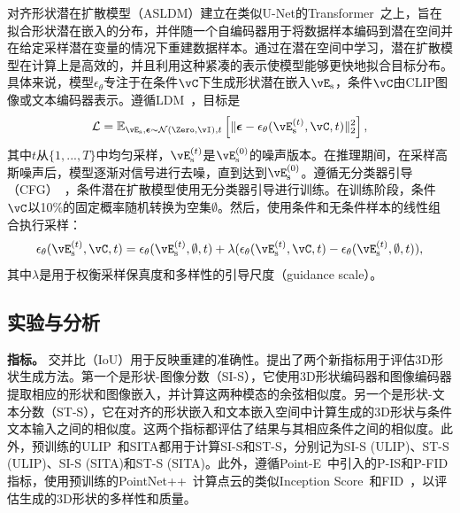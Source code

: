 \documentclass[../../book-main_zh.tex]{subfiles}
\begin{document}
对齐形状潜在扩散模型（ASLDM）建立在类似U-Net的Transformer~\cite{10203178}之上，旨在拟合形状潜在嵌入的分布，并伴随一个自编码器用于将数据样本编码到潜在空间并在给定采样潜在变量的情况下重建数据样本。通过在潜在空间中学习，潜在扩散模型在计算上是高效的，并且利用这种紧凑的表示使模型能够更快地拟合目标分布。具体来说，模型$\epsilon_{\theta}$专注于在条件$\vC$下生成形状潜在嵌入$\vE_{\mathrm{s}}$，条件$\vC$由CLIP图像或文本编码器表示。遵循LDM~\cite{rombach2022high}，目标是
\begin{equation}
\mathcal{L} = \mathbb{E}_{\vE_{\mathrm{s}}, \boldsymbol{\epsilon} \sim
\mathcal{N}(\Zero,\vI),t} \left[ \Vert \boldsymbol{\epsilon}
- \epsilon_\theta(\vE_{\mathrm{s}}^{(t)}, \vC, t) \Vert^2_2 \right],
\end{equation}
其中$t$从$\{1, ..., T\}$中均匀采样，$\vE_{\mathrm{s}}^{(t)}$是$\vE_{\mathrm{s}}^{(0)}$的噪声版本。在推理期间，在采样高斯噪声后，模型逐渐对信号进行去噪，直到达到$\vE_{\mathrm{s}}^{(0)}$。遵循无分类器引导（CFG）~\cite{ho2021classifierfree}，条件潜在扩散模型使用无分类器引导进行训练。在训练阶段，条件$\vC$以10\%的固定概率随机转换为空集$\emptyset$。然后，使用条件和无条件样本的线性组合执行采样：
\begin{equation}
\epsilon_\theta ( \vE_{\mathrm{s}}^{(t)}, \vC, t ) = \epsilon_\theta(
\vE_{\mathrm{s}}^{(t)}, \emptyset, t ) + \lambda
( \epsilon_\theta( \vE_{\mathrm{s}}^{(t)}, \vC, t ) -\epsilon_\theta(
\vE_{\mathrm{s}}^{(t)}, \emptyset, t ) ),
\label{eq:cfg-michelangelo}
\end{equation}
其中$\lambda$是用于权衡采样保真度和多样性的引导尺度（guidance scale）。

\subsection{实验与分析}

\textbf{指标。}
交并比（IoU）用于反映重建的准确性。提出了两个新指标用于评估3D形状生成方法。第一个是形状-图像分数（SI-S），它使用3D形状编码器和图像编码器提取相应的形状和图像嵌入，并计算这两种模态的余弦相似度。另一个是形状-文本分数（ST-S），它在对齐的形状嵌入和文本嵌入空间中计算生成的3D形状与条件文本输入之间的相似度。这两个指标都评估了结果与其相应条件之间的相似度。此外，预训练的ULIP~\cite{10203465}和SITA都用于计算SI-S和ST-S，分别记为SI-S (ULIP)、ST-S (ULIP)、SI-S (SITA)和ST-S (SITA)。此外，遵循Point-E~\cite{nichol2022point}中引入的P-IS和P-FID指标，使用预训练的PointNet++~\cite{NIPS2017_d8bf84be}计算点云的类似Inception Score~\cite{NIPS2016_8a3363ab}和FID~\cite{NIPS2017_8a1d6947}，以评估生成的3D形状的多样性和质量。
\end{document}

